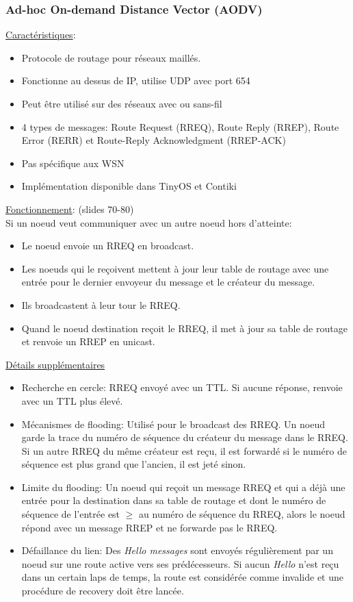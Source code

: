\documentclass{article}
\begin{document}
\begin{sffamily}
\subsubsection{Ad-hoc On-demand Distance Vector (AODV)}
\underline{Caractéristiques}:
\begin{itemize}
\item Protocole de routage pour réseaux maillés.
\item Fonctionne au dessus de IP, utilise UDP avec port 654
\item Peut être utilisé sur des réseaux avec ou sans-fil
\item 4 types de messages:
  Route Request (RREQ), Route Reply (RREP), Route Error (RERR) et
  Route-Reply Acknowledgment (RREP-ACK)
\item Pas spécifique aux WSN
\item Implémentation disponible dans TinyOS et Contiki
\end{itemize}

\underline{Fonctionnement}: (slides 70-80)\\
Si un noeud veut communiquer avec un autre noeud hors d'atteinte:
\begin{itemize}
\item Le noeud envoie un RREQ en broadcast.
\item Les noeuds qui le reçoivent mettent à jour leur table de routage
  avec une entrée pour le dernier envoyeur du message et le créateur du
  message.
\item Ils broadcastent à leur tour le RREQ.
\item Quand le noeud destination reçoit le RREQ, il met à jour sa table
  de routage et renvoie un RREP en unicast.
\end{itemize}

\underline{Détails supplémentaires}
\begin{itemize}
\item Recherche en cercle: RREQ envoyé avec un TTL. Si aucune réponse,
  renvoie avec un TTL plus élevé.
\item Mécanismes de flooding: Utilisé pour le broadcast des RREQ. Un noeud
  garde la trace du numéro de séquence du créateur du message dans le RREQ.
  Si un autre RREQ du même créateur est reçu, il est forwardé si le numéro
  de séquence est plus grand que l'ancien, il est jeté sinon.
\item Limite du flooding: Un noeud qui reçoit un message RREQ et qui
  a déjà une entrée pour la destination dans sa table de routage et
  dont le numéro de séquence de l'entrée est $\geq$ au numéro de séquence du
  RREQ, alors le noeud répond avec un message RREP et ne forwarde pas le RREQ.
\item Défaillance du lien: Des \textit{Hello messages} sont envoyés
  régulièrement par un noeud sur une route active vers ses prédécesseurs.
  Si aucun \textit{Hello} n'est reçu dans un certain laps de temps, la route
  est considérée comme invalide et une procédure de recovery doit être lancée.
\end{itemize}


\end{sffamily}
\end{document}
